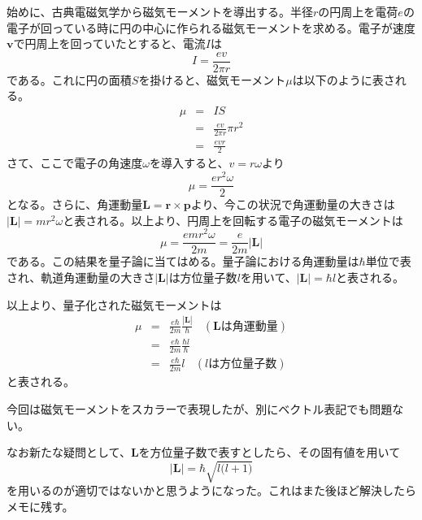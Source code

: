 \documentclass[11pt,a4paper]{jsarticle}
\begin{document}
\begin{boxnote}
  始めに、古典電磁気学から磁気モーメントを導出する。半径$r$の円周上を電荷$e$の電子が回っている時に円の中心に作られる磁気モーメントを求める。電子が速度$\bm{v}$で円周上を回っていたとすると、電流$I$は
  \begin{equation}
    I = \frac{ev}{2 \pi r}
  \end{equation}
  である。これに円の面積$S$を掛けると、磁気モーメント$\mu$は以下のように表される。
  \begin{eqnarray}
    \mu &=& IS\\
    &=&  \frac{ev}{2 \pi r} \pi r^2\\
    &=&  \frac{evr}{2}
  \end{eqnarray}
  さて、ここで電子の角速度$\omega$を導入すると、$v = r\omega$より
  \begin{equation}
    \mu = \frac{er^2 \omega}{2}
  \end{equation}
  となる。さらに、角運動量$\bm{L}=\bm{r} \times \bm{p}$より、今この状況で角運動量の大きさは$|\bm{L}|=m r^2 \omega$と表される。以上より、円周上を回転する電子の磁気モーメントは
  \begin{equation}
    \mu = \frac{e m r^2 \omega}{2m} = \frac{e}{2m} |\bm{L}|
  \end{equation}
  である。この結果を量子論に当てはめる。量子論における角運動量は$\hbar$単位で表され、軌道角運動量の大きさ$|\bm{L}|$は方位量子数$l$を用いて、$|\bm{L}|=\hbar l$と表される。
\end{boxnote}
\clearpage
\begin{boxnote}
  以上より、量子化された磁気モーメントは
  \begin{eqnarray}
    \mu &=& \frac{e \hbar}{2m} \frac{|\bm{L}|}{\hbar}~~~~(\bm{L}は角運動量)\\
    &=& \frac{e \hbar}{2m} \frac{\hbar l}{\hbar}\\
    &=& \frac{e \hbar}{2m} l~~~~(lは方位量子数)
  \end{eqnarray}
  と表される。

  今回は磁気モーメントをスカラーで表現したが、別にベクトル表記でも問題ない。

  なお新たな疑問として、$\bm{L}$を方位量子数で表すとしたら、その固有値を用いて
  \begin{equation}
    |\bm{L}| = \hbar \sqrt{l \bigl(l + 1\bigr)}
  \end{equation}
  を用いるのが適切ではないかと思うようになった。これはまた後ほど解決したらメモに残す。
\end{boxnote}

\end{document}
